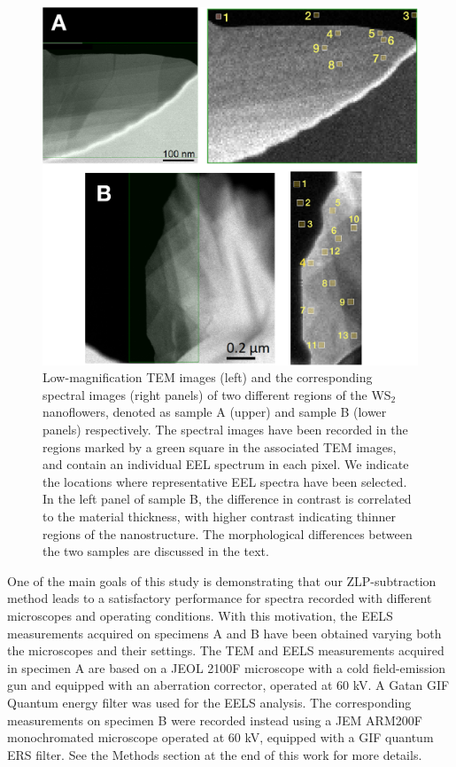 \begin{figure}[H]
\begin{centering}
  \includegraphics[width=0.87\linewidth]{plots/Spectra_location2.pdf}
  \caption{Low-magnification TEM images (left) and the corresponding
    spectral images (right panels) of two different regions of
    the WS$_2$ nanoflowers, denoted as sample A (upper) and sample B (lower panels) respectively.
    The spectral images have been recorded in the regions marked by a green square
    in the associated TEM images, and contain an individual EEL spectrum in each pixel.
    We indicate the locations where representative
    EEL spectra have been selected. 
    In the left panel of sample B, the difference in contrast is correlated to the material
    thickness, with higher contrast indicating thinner regions of the nanostructure.
    The morphological differences between the two samples are discussed in the text.
  }
\label{fig:ws2positions}
\end{centering}
\end{figure}

One of the main goals of this study is demonstrating that our ZLP-subtraction method leads to
a satisfactory performance for spectra recorded with different microscopes and operating conditions.
%
With this motivation, the EELS measurements acquired on specimens A and B have
been obtained varying both the microscopes and their settings.
%
The TEM and EELS measurements acquired in specimen A  are based on a JEOL 2100F
microscope with a cold field-emission gun and equipped with an aberration corrector,
operated at 60 kV. A Gatan GIF Quantum energy filter was used for
the EELS analysis.
%
The corresponding measurements on specimen B were recorded instead
using a JEM ARM200F monochromated microscope operated at 60 kV, equipped with a GIF quantum ERS filter.
%
See the Methods section at the end of this work for more details.\\

